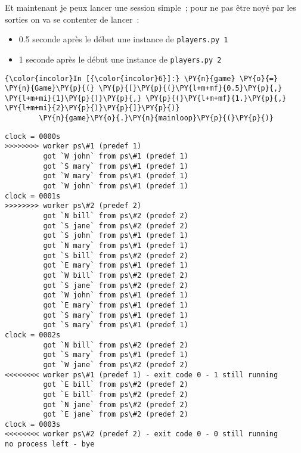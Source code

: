     Et maintenant je peux lancer une session simple~; pour ne pas être noyé
par les sorties on va se contenter de lancer~:

\begin{itemize}
\tightlist
\item
  0.5 seconde après le début une instance de \texttt{players.py\ 1}
\item
  1 seconde après le début une instance de \texttt{players.py\ 2}
\end{itemize}

    \begin{Verbatim}[commandchars=\\\{\},frame=single,framerule=0.3mm,rulecolor=\color{cellframecolor}]
{\color{incolor}In [{\color{incolor}6}]:} \PY{n}{game} \PY{o}{=} \PY{n}{Game}\PY{p}{(} \PY{p}{[}\PY{p}{(}\PY{l+m+mf}{0.5}\PY{p}{,} \PY{l+m+mi}{1}\PY{p}{)}\PY{p}{,} \PY{p}{(}\PY{l+m+mf}{1.}\PY{p}{,} \PY{l+m+mi}{2}\PY{p}{)}\PY{p}{]}\PY{p}{)}
        \PY{n}{game}\PY{o}{.}\PY{n}{mainloop}\PY{p}{(}\PY{p}{)}
\end{Verbatim}


    \begin{Verbatim}[commandchars=\\\{\},frame=single,framerule=0.3mm,rulecolor=\color{cellframecolor}]
clock = 0000s
>>>>>>>> worker ps\#1 (predef 1)
         got `W john` from ps\#1 (predef 1)
         got `S mary` from ps\#1 (predef 1)
         got `W mary` from ps\#1 (predef 1)
         got `W john` from ps\#1 (predef 1)
clock = 0001s
>>>>>>>> worker ps\#2 (predef 2)
         got `N bill` from ps\#2 (predef 2)
         got `S jane` from ps\#2 (predef 2)
         got `S john` from ps\#1 (predef 1)
         got `N mary` from ps\#1 (predef 1)
         got `S bill` from ps\#2 (predef 2)
         got `E mary` from ps\#1 (predef 1)
         got `W bill` from ps\#2 (predef 2)
         got `S jane` from ps\#2 (predef 2)
         got `W john` from ps\#1 (predef 1)
         got `E mary` from ps\#1 (predef 1)
         got `S mary` from ps\#1 (predef 1)
         got `S mary` from ps\#1 (predef 1)
clock = 0002s
         got `N bill` from ps\#2 (predef 2)
         got `S mary` from ps\#1 (predef 1)
         got `W jane` from ps\#2 (predef 2)
<<<<<<<< worker ps\#1 (predef 1) - exit code 0 - 1 still running
         got `E bill` from ps\#2 (predef 2)
         got `E bill` from ps\#2 (predef 2)
         got `N jane` from ps\#2 (predef 2)
         got `E jane` from ps\#2 (predef 2)
clock = 0003s
<<<<<<<< worker ps\#2 (predef 2) - exit code 0 - 0 still running
no process left - bye
\end{Verbatim}

